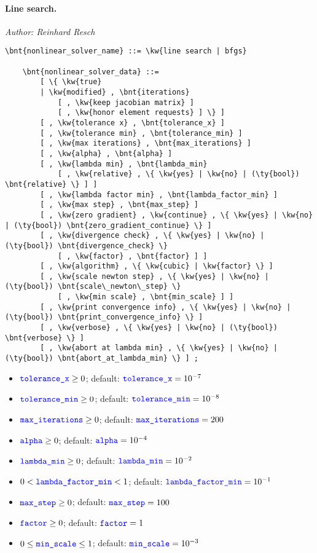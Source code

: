 \paragraph{Line search.}
\emph{Author: Reinhard Resch}
\begin{Verbatim}[commandchars=\\\{\}]
    \bnt{nonlinear_solver_name} ::= \kw{line search | bfgs}

    \bnt{nonlinear_solver_data} ::= 
        [ \{ \kw{true}
        | \kw{modified} , \bnt{iterations}
            [ , \kw{keep jacobian matrix} ]
            [ , \kw{honor element requests} ] \} ]
        [ , \kw{tolerance x} , \bnt{tolerance_x} ]
        [ , \kw{tolerance min} , \bnt{tolerance_min} ]
        [ , \kw{max iterations} , \bnt{max_iterations} ]
        [ , \kw{alpha} , \bnt{alpha} ]
        [ , \kw{lambda min} , \bnt{lambda_min}
            [ , \kw{relative} , \{ \kw{yes} | \kw{no} | (\ty{bool}) \bnt{relative} \} ] ]
        [ , \kw{lambda factor min} , \bnt{lambda_factor_min} ]
        [ , \kw{max step} , \bnt{max_step} ]
        [ , \kw{zero gradient} , \kw{continue} , \{ \kw{yes} | \kw{no} | (\ty{bool}) \bnt{zero_gradient_continue} \} ]
        [ , \kw{divergence check} , \{ \kw{yes} | \kw{no} | (\ty{bool}) \bnt{divergence_check} \}
            [ , \kw{factor} , \bnt{factor} ] ]
        [ , \kw{algorithm} , \{ \kw{cubic} | \kw{factor} \} ]
        [ , \kw{scale newton step} , \{ \kw{yes} | \kw{no} | (\ty{bool}) \bnt{scale\_newton\_step} \}
            [ , \kw{min scale} , \bnt{min_scale} ] ]
        [ , \kw{print convergence info} , \{ \kw{yes} | \kw{no} | (\ty{bool}) \bnt{print_convergence_info} \} ]
        [ , \kw{verbose} , \{ \kw{yes} | \kw{no} | (\ty{bool}) \bnt{verbose} \} ]
        [ , \kw{abort at lambda min} , \{ \kw{yes} | \kw{no} | (\ty{bool}) \bnt{abort_at_lambda_min} \} ] ;
\end{Verbatim}
\begin{itemize}
\item $\textcolor{blue}{\texttt{tolerance\_x}} \ge 0$; default: $\textcolor{blue}{\texttt{tolerance\_x}}=10^{-7}$
\item $\textcolor{blue}{\texttt{tolerance\_min}} \ge 0$; default: $\textcolor{blue}{\texttt{tolerance\_min}} = 10^{-8}$
\item $\textcolor{blue}{\texttt{max\_iterations}} \ge 0$; default: $\textcolor{blue}{\texttt{max\_iterations}} = 200$
\item $\textcolor{blue}{\texttt{alpha}} \ge 0$; default: $\textcolor{blue}{\texttt{alpha}}=10^{-4}$
\item $\textcolor{blue}{\texttt{lambda\_min}} \ge 0$; default: $\textcolor{blue}{\texttt{lambda\_min}}=10^{-2}$
\item $0 < \textcolor{blue}{\texttt{lambda\_factor\_min}} < 1$; default: $\textcolor{blue}{\texttt{lambda\_factor\_min}}=10^{-1}$
\item $\textcolor{blue}{\texttt{max\_step}} \ge 0$; default: $\textcolor{blue}{\texttt{max\_step}} = 100$
\item $\textcolor{blue}{\texttt{factor}} \ge 0$; default: $\textcolor{blue}{\texttt{factor}} = 1$
\item $0 \le \textcolor{blue}{\texttt{min\_scale}} \le 1$; default: $\textcolor{blue}{\texttt{min\_scale}}=10^{-3}$
\end{itemize}

